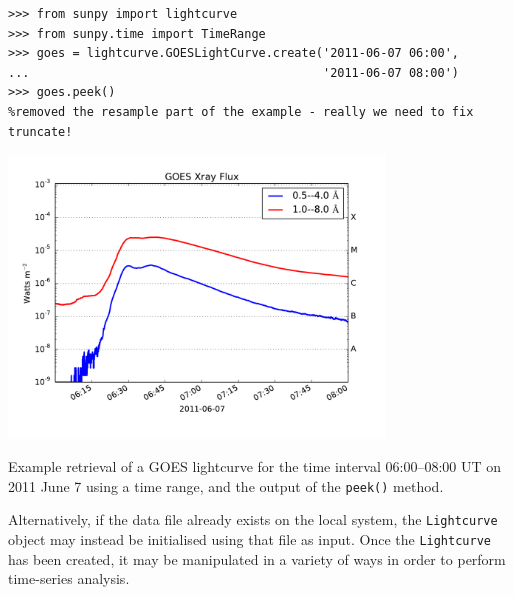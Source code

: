 \begin{listing}[H]
\begin{verbatim}
>>> from sunpy import lightcurve
>>> from sunpy.time import TimeRange
>>> goes = lightcurve.GOESLightCurve.create('2011-06-07 06:00',
...                                         '2011-06-07 08:00')
>>> goes.peek()
%removed the resample part of the example - really we need to fix truncate!
\end{verbatim}
\begin{center}
\includegraphics[width=10cm]{goes_lightcurve.pdf}
\end{center}
\caption{Example retrieval of a GOES lightcurve for the time interval 
06:00--08:00 UT on 2011 June 7 using a time range, and the output of the 
\texttt{peek()} method.}
\label{code:goes_lc}
\end{listing}

Alternatively, if the data file already exists on the local system, the 
\texttt{Lightcurve} object may instead be initialised using that file as input.
Once the \texttt{Lightcurve} has been created, it may be manipulated in 
a variety of ways in order to perform time-series analysis.

